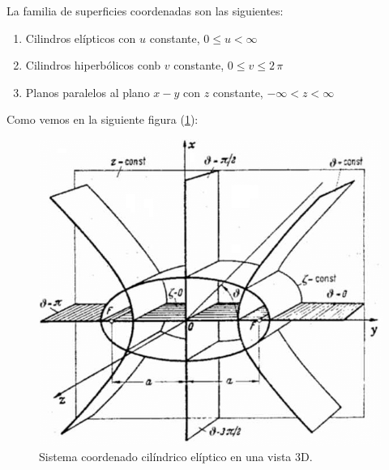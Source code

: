 La familia de superficies coordenadas son las siguientes:
\begin{enumerate}
\item Cilindros elípticos con $u$ constante, $0 \leq u < \infty$
\item Cilindros hiperbólicos conb $v$ constante, $0 \leq v \leq 2 \, \pi$
\item Planos paralelos al plano $x-y$ con $z$ constante, $-\infty < z < \infty$
\end{enumerate}
Como vemos en la siguiente figura (\ref{fig:figura_coordenada_cilindricas_elipticas_3D}):
\begin{figure}[H]
    \centering
    \includegraphics[scale=0.5]{Imagenes/Elliptic-cylindrical-coordinates_02.png}
    \caption{Sistema coordenado cilíndrico elíptico en una vista 3D.}
    \label{fig:figura_coordenada_cilindricas_elipticas_3D}
\end{figure}
